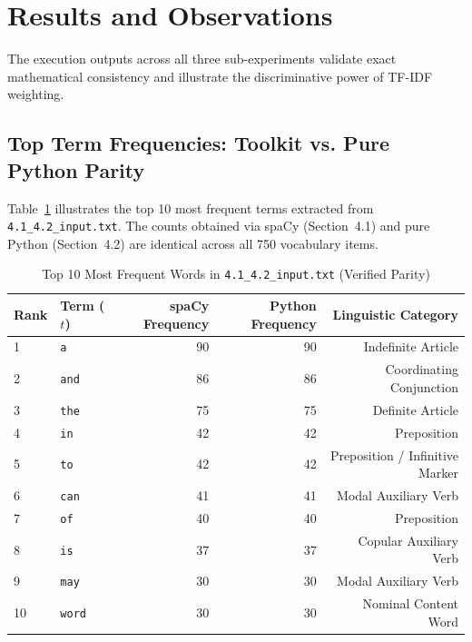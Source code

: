 \section{Results and Observations}
The execution outputs across all three sub-experiments validate exact mathematical consistency and illustrate the discriminative power of TF-IDF weighting.

\subsection{Top Term Frequencies: Toolkit vs. Pure Python Parity}
Table~\ref{tab:exp4_top_tf} illustrates the top 10 most frequent terms extracted from \texttt{4.1\_4.2\_input.txt}. The counts obtained via spaCy (Section~4.1) and pure Python (Section~4.2) are identical across all 750 vocabulary items.
\begin{table}[H]
\centering
\small
\caption{Top 10 Most Frequent Words in \texttt{4.1\_4.2\_input.txt} (Verified Parity)}
\label{tab:exp4_top_tf}
\begin{tabular}{llrrr}
\toprule
\textbf{Rank} & \textbf{Term ($t$)} & \textbf{spaCy Frequency} & \textbf{Python Frequency} & \textbf{Linguistic Category} \\
\midrule
1 & \texttt{a} & 90 & 90 & Indefinite Article \\
2 & \texttt{and} & 86 & 86 & Coordinating Conjunction \\
3 & \texttt{the} & 75 & 75 & Definite Article \\
4 & \texttt{in} & 42 & 42 & Preposition \\
5 & \texttt{to} & 42 & 42 & Preposition / Infinitive Marker \\
6 & \texttt{can} & 41 & 41 & Modal Auxiliary Verb \\
7 & \texttt{of} & 40 & 40 & Preposition \\
8 & \texttt{is} & 37 & 37 & Copular Auxiliary Verb \\
9 & \texttt{may} & 30 & 30 & Modal Auxiliary Verb \\
10 & \texttt{word} & 30 & 30 & Nominal Content Word \\
\bottomrule
\end{tabular}
\end{table}

